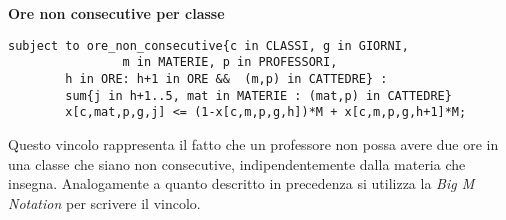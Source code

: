 \documentclass{article}
\begin{document}
\\\\\textbf{Ore non consecutive per classe}
\begin{verbatim}
subject to ore_non_consecutive{c in CLASSI, g in GIORNI,
                m in MATERIE, p in PROFESSORI, 
		h in ORE: h+1 in ORE &&  (m,p) in CATTEDRE} :
		sum{j in h+1..5, mat in MATERIE : (mat,p) in CATTEDRE} 
		x[c,mat,p,g,j] <= (1-x[c,m,p,g,h])*M + x[c,m,p,g,h+1]*M;
\end{verbatim}
Questo vincolo rappresenta il fatto che un professore non possa avere due ore in una classe che siano non consecutive, indipendentemente dalla materia che insegna. Analogamente a quanto descritto in precedenza si utilizza la \emph{Big M Notation} per scrivere il vincolo.
\end{document}

